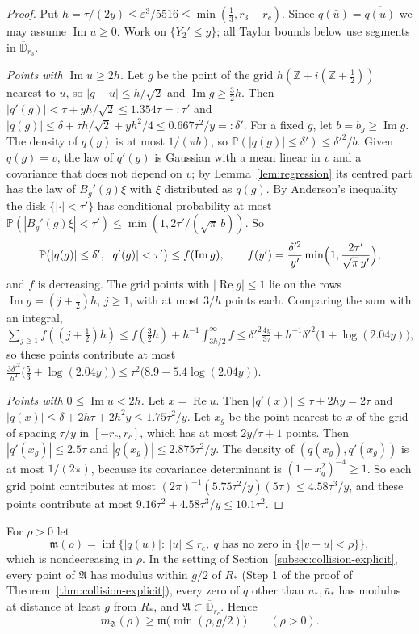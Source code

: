 \documentclass[11pt]{amsart}
\theoremstyle{definition}
\theoremstyle{remark}
\numberwithin{equation}{section}
\newcommand{\Z}{\mathbb{Z}}
\newcommand{\D}{\mathbb{D}}
\newcommand{\PP}{\mathbb{P}}
\newcommand{\eps}{\varepsilon}
\DeclareMathOperator{\re}{Re}
\DeclareMathOperator{\im}{Im}
\begin{document}
\begin{proof}
Put $h=\tau/(2y)\le\eps^3/5516\le\min(\frac13,r_3-r_c)$. Since $q(\bar u)=\overline{q(u)}$ we may assume $\im u\ge0$. Work on $\{Y_2'\le y\}$; all Taylor bounds below use segments in $\overline{\D}_{r_3}$.

\emph{Points with $\im u\ge2h$.} Let $g$ be the point of the grid $h(\Z+i(\Z+\frac12))$ nearest to $u$, so $|g-u|\le h/\sqrt2$ and $\im g\ge\frac32h$. Then $|q'(g)|<\tau+yh/\sqrt2\le1.354\tau=:\tau'$ and $|q(g)|\le\delta+\tau h/\sqrt2+yh^2/4\le0.667\tau^2/y=:\delta'$. For a fixed $g$, let $b=b_g\ge\im g$. The density of $q(g)$ is at most $1/(\pi b)$, so $\PP(|q(g)|\le\delta')\le\delta'^2/b$. Given $q(g)=v$, the law of $q'(g)$ is Gaussian with a mean linear in $v$ and a covariance that does not depend on $v$; by Lemma~\ref{lem:regression} its centred part has the law of $B_g'(g)\xi$ with $\xi$ distributed as $q(g)$. By Anderson's inequality \cite{An} %
the disk $\{|\cdot|<\tau'\}$ has conditional probability at most $\PP(|B_g'(g)\xi|<\tau')\le\min(1,2\tau'/(\sqrt\pi\,b))$. So
\[
\PP\bigl(|q(g)|\le\delta',\ |q'(g)|<\tau'\bigr)\le f(\im g),\qquad f(y')=\frac{\delta'^2}{y'}\min\Bigl(1,\frac{2\tau'}{\sqrt\pi\,y'}\Bigr),
\]
and $f$ is decreasing. The grid points with $|\re g|\le1$ lie on the rows $\im g=(j+\frac12)h$, $j\ge1$, with at most $3/h$ points each. Comparing the sum with an integral, $\sum_{j\ge1}f((j+\frac12)h)\le f(\frac32h)+h^{-1}\int_{3h/2}^\infty f\le\delta'^2\frac{4y}{3\tau}+h^{-1}\delta'^2\bigl(1+\log(2.04y)\bigr)$, so these points contribute at most $\frac{3\delta'^2}{h^2}\bigl(\frac53+\log(2.04y)\bigr)\le\tau^2\bigl(8.9+5.4\log(2.04y)\bigr)$.

\emph{Points with $0\le\im u<2h$.} Let $x=\re u$. Then $|q'(x)|\le\tau+2hy=2\tau$ and $|q(x)|\le\delta+2h\tau+2h^2y\le1.75\tau^2/y$. Let $x_g$ be the point nearest to $x$ of the grid of spacing $\tau/y$ in $[-r_c,r_c]$, which has at most $2y/\tau+1$ points. Then $|q'(x_g)|\le2.5\tau$ and $|q(x_g)|\le2.875\tau^2/y$. The density of $(q(x_g),q'(x_g))$ is at most $1/(2\pi)$, because its covariance determinant is $(1-x_g^2)^{-4}\ge1$. So each grid point contributes at most $(2\pi)^{-1}(5.75\tau^2/y)(5\tau)\le4.58\tau^3/y$, and these points contribute at most $9.16\tau^2+4.58\tau^3/y\le10.1\tau^2$.
\end{proof}

For $\rho>0$ let
\[
\mathfrak m(\rho)=\inf\bigl\{|q(u)|:\ |u|\le r_c,\ q\text{ has no zero in }\{|v-u|<\rho\}\bigr\},
\]
which is nondecreasing in $\rho$. In the setting of Section~\ref{subsec:collision-explicit}, every point of $\mathfrak A$ has modulus within $g/2$ of $R_*$ (Step 1 of the proof of Theorem~\ref{thm:collision-explicit}), every zero of $q$ other than $u_*,\bar u_*$ has modulus at distance at least $g$ from $R_*$, and $\mathfrak A\subset\overline{\D}_{r_c}$. Hence
\begin{equation}\label{eq:depth-annulus}
m_{\mathfrak A}(\rho)\ge\mathfrak m\bigl(\min(\rho,g/2)\bigr)\qquad(\rho>0).
\end{equation}
\end{document}
